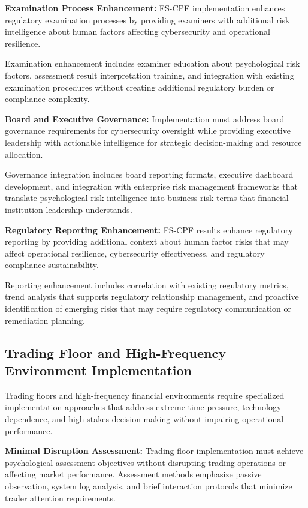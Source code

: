 \documentclass[10pt, twocolumn]{article}
\begin{document}
\textbf{Examination Process Enhancement:} FS-CPF implementation enhances regulatory examination processes by providing examiners with additional risk intelligence about human factors affecting cybersecurity and operational resilience.

Examination enhancement includes examiner education about psychological risk factors, assessment result interpretation training, and integration with existing examination procedures without creating additional regulatory burden or compliance complexity.

\textbf{Board and Executive Governance:} Implementation must address board governance requirements for cybersecurity oversight while providing executive leadership with actionable intelligence for strategic decision-making and resource allocation.

Governance integration includes board reporting formats, executive dashboard development, and integration with enterprise risk management frameworks that translate psychological risk intelligence into business risk terms that financial institution leadership understands.

\textbf{Regulatory Reporting Enhancement:} FS-CPF results enhance regulatory reporting by providing additional context about human factor risks that may affect operational resilience, cybersecurity effectiveness, and regulatory compliance sustainability.

Reporting enhancement includes correlation with existing regulatory metrics, trend analysis that supports regulatory relationship management, and proactive identification of emerging risks that may require regulatory communication or remediation planning.

\subsection{Trading Floor and High-Frequency Environment Implementation}

Trading floors and high-frequency financial environments require specialized implementation approaches that address extreme time pressure, technology dependence, and high-stakes decision-making without impairing operational performance.

\textbf{Minimal Disruption Assessment:} Trading floor implementation must achieve psychological assessment objectives without disrupting trading operations or affecting market performance. Assessment methods emphasize passive observation, system log analysis, and brief interaction protocols that minimize trader attention requirements.
\end{document}
